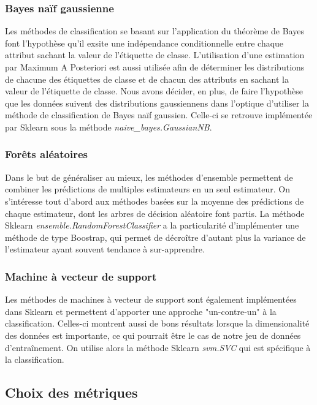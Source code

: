 \subsubsection*{Bayes naïf gaussienne}
Les méthodes de classification se basant sur l'application du théorème de Bayes font l'hypothèse qu'il exsite une indépendance conditionnelle entre chaque attribut sachant la valeur de l'étiquette de classe. L'utilisation d'une estimation par Maximum A Posteriori est aussi utilisée afin de déterminer les distributions de chacune des étiquettes de classe et de chacun des attributs en sachant la valeur de l'étiquette de classe. Nous avons décider, en plus, de faire l'hypothèse que les données suivent des distributions gaussiennens dans l'optique d'utiliser la méthode de classification de Bayes naïf gaussien. Celle-ci se retrouve implémentée par Sklearn sous la méthode \emph{naive\_bayes.GaussianNB}.

\subsubsection*{Forêts aléatoires}
Dans le but de généraliser au mieux, les méthodes d'ensemble permettent de combiner les prédictions de multiples estimateurs en un seul estimateur. On s'intéresse tout d'abord aux méthodes basées sur la moyenne des prédictions de chaque estimateur, dont les arbres de décision aléatoire font partis. 
La méthode Sklearn \emph{ensemble.RandomForestClassifier} a la particularité d'implémenter une méthode de type Boostrap, qui permet de décroître d'autant plus la variance de l'estimateur ayant souvent tendance à sur-apprendre.

\subsubsection*{Machine à vecteur de support}
Les méthodes de machines à vecteur de support sont également implémentées dans Sklearn et permettent d'apporter une approche "un-contre-un" à la classification. Celles-ci montrent aussi de bons résultats lorsque la dimensionalité des données est importante, ce qui pourrait être le cas de notre jeu de données d'entraînement. On utilise alors la méthode Sklearn \emph{svm.SVC} qui est spécifique à la classification.

\subsection{Choix des métriques}

